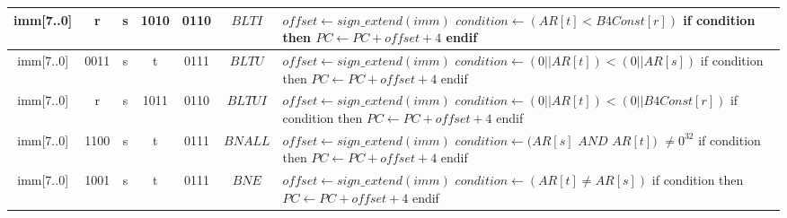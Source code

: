\begin{smalltables}
\begin{longtable}{llllllllllllllllllllllll  p{1cm}  p{7cm} | }
        \multicolumn{8}{|c|}{imm[7..0]} & \multicolumn{4}{c|}{r} & \multicolumn{4}{c|}{s} & \multicolumn{4}{c|}{1010} & \multicolumn{4}{c|}{0110} & \multicolumn{1}{c|}{$BLTI$} & $offset \leftarrow sign\_extend(imm)$ \newline $condition \leftarrow (AR[t] < B4Const[r])$ \newline if     condition then \newline $PC \leftarrow PC + offset + 4$ \newline endif\\ \hline
		\multicolumn{8}{|c|}{imm[7..0]} & \multicolumn{4}{c|}{0011} & \multicolumn{4}{c|}{s} & \multicolumn{4}{c|}{t} & \multicolumn{4}{c|}{0111} & \multicolumn{1}{c|}{$BLTU$} & $offset \leftarrow sign\_extend(imm)$ \newline $condition \leftarrow (0||AR[t]) < (0||AR[s])$ \newline if condition then \newline $PC \leftarrow PC + offset + 4$ \newline endif\\ \hline
        \multicolumn{8}{|c|}{imm[7..0]} & \multicolumn{4}{c|}{r} & \multicolumn{4}{c|}{s} & \multicolumn{4}{c|}{1011} & \multicolumn{4}{c|}{0110} & \multicolumn{1}{c|}{$BLTUI$} & $offset \leftarrow sign\_extend(imm)$ \newline $condition \leftarrow (0||AR[t]) < (0||B4Const[r])$ \newline if condition then \newline $PC \leftarrow PC + offset + 4$ \newline endif\\ \hline
       \multicolumn{8}{|c|}{imm[7..0]} & \multicolumn{4}{c|}{1100} & \multicolumn{4}{c|}{s} & \multicolumn{4}{c|}{t} & \multicolumn{4}{c|}{0111} & \multicolumn{1}{c|}{$BNALL$} & $offset \leftarrow sign\_extend(imm)$ \newline $condition \leftarrow (AR[s]$ $AND$ $AR[t])$ $\neq0^{32}$ \newline if condition then \newline $PC \leftarrow PC + offset + 4$ \newline endif\\ \hline
	   \multicolumn{8}{|c|}{imm[7..0]} & \multicolumn{4}{c|}{1001} & \multicolumn{4}{c|}{s} & \multicolumn{4}{c|}{t} & \multicolumn{4}{c|}{0111} & \multicolumn{1}{c|}{$BNE$} & $offset \leftarrow sign\_extend(imm)$ \newline $condition \leftarrow (AR[t] \neq AR[s])$ \newline if condition then \newline $PC \leftarrow PC + offset + 4$ \newline endif\\ \hline

\end{longtable}
\end{smalltables}
